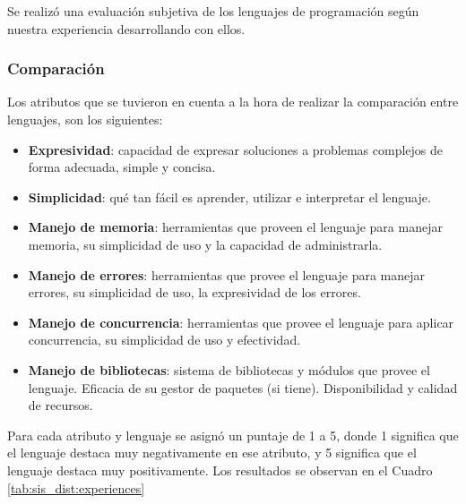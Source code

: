 \documentclass[11pt]{article}
\let\Oldsubsubsection\subsubsection
\renewcommand{\subsubsection}{\FloatBarrier\Oldsubsubsection}
\begin{document}
Se realizó una evaluación subjetiva de los lenguajes de programación según nuestra experiencia desarrollando con ellos.

\subsubsection{Comparación} \label{sec:subjective_comparison}

Los atributos que se tuvieron en cuenta a la hora de realizar la comparación entre lenguajes, son los siguientes:

\begin{itemize}
    \item \textbf{Expresividad}: capacidad de expresar soluciones a problemas complejos de forma adecuada, simple y concisa.
    \item \textbf{Simplicidad}: qué tan fácil es aprender, utilizar e interpretar el lenguaje.
    \item \textbf{Manejo de memoria}: herramientas que proveen el lenguaje para manejar memoria, su simplicidad de uso y la capacidad de administrarla.
    \item \textbf{Manejo de errores}: herramientas que provee el lenguaje para manejar errores, su simplicidad de uso, la expresividad de los errores.
    \item \textbf{Manejo de concurrencia}: herramientas que provee el lenguaje para aplicar concurrencia, su simplicidad de uso y efectividad.
    \item \textbf{Manejo de bibliotecas}: sistema de bibliotecas y módulos que provee el lenguaje. Eficacia de su gestor de paquetes (si tiene). Disponibilidad y calidad de recursos.
\end{itemize}

Para cada atributo y lenguaje se asignó un puntaje de 1 a 5, donde 1 significa que el lenguaje destaca muy negativamente en ese atributo, y 5 significa que el lenguaje destaca muy positivamente. Los resultados se observan en el Cuadro \ref{tab:sis_dist:experiences}
\end{document}

